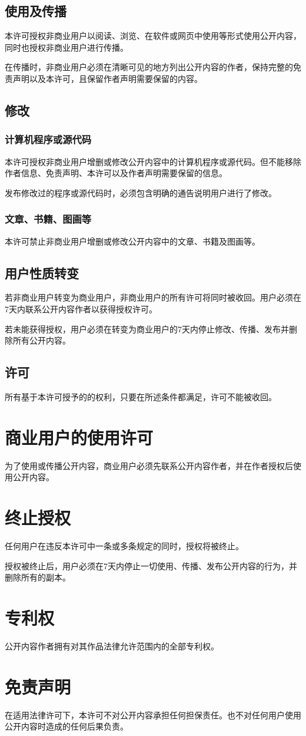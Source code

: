 \documentclass[utf-8,12pt]{ctexart}%
\begin{document}
\subsection{使用及传播}
本许可授权非商业用户以阅读、浏览、在软件或网页中使用等形式使用公开内容，同时也授权非商业用户进行传播。

在传播时，非商业用户必须在清晰可见的地方列出公开内容的作者，保持完整的免责声明以及本许可，且保留作者声明需要保留的内容。
\subsection{修改}
\subsubsection{计算机程序或源代码}
本许可授权非商业用户增删或修改公开内容中的计算机程序或源代码。但不能移除作者信息、免责声明、本许可以及作者声明需要保留的信息。

发布修改过的程序或源代码时，必须包含明确的通告说明用户进行了修改。
\subsubsection{文章、书籍、图画等}
本许可禁止非商业用户增删或修改公开内容中的文章、书籍及图画等。
\subsection{用户性质转变}
若非商业用户转变为商业用户，非商业用户的所有许可将同时被收回。用户必须在7天内联系公开内容作者以获得授权许可。

若未能获得授权，用户必须在转变为商业用户的7天内停止修改、传播、发布并删除所有公开内容。
\subsection{许可}
所有基于本许可授予的的权利，只要在所述条件都满足，许可不能被收回。
\section{商业用户的使用许可}
为了使用或传播公开内容，商业用户必须先联系公开内容作者，并在作者授权后使用公开内容。
\section{终止授权}
任何用户在违反本许可中一条或多条规定的同时，授权将被终止。

授权被终止后，用户必须在7天内停止一切使用、传播、发布公开内容的行为，并删除所有的副本。
\section{专利权}
公开内容作者拥有对其作品法律允许范围内的全部专利权。
\section{免责声明}
在适用法律许可下，本许可不对公开内容承担任何担保责任。也不对任何用户使用公开内容时造成的任何后果负责。
\end{document}
